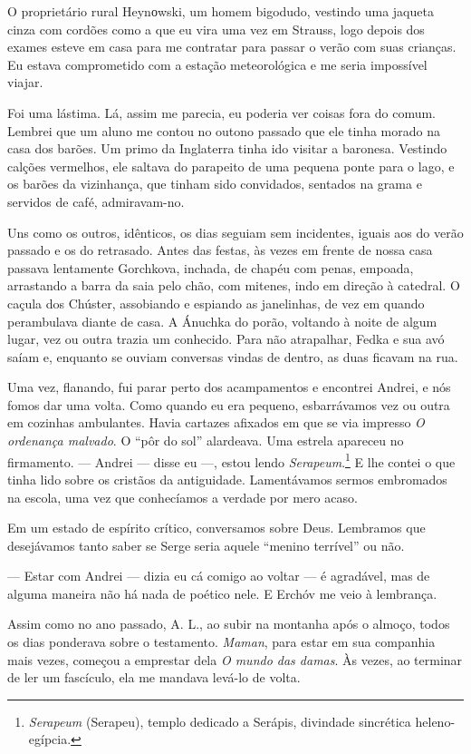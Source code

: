 O proprietário rural Heynоwski, um homem bigodudo, vestindo uma jaqueta
cinza com cordões como a que eu vira uma vez em Strauss, logo depois dos
exames esteve em casa para me contratar para passar o verão com suas
crianças. Eu estava comprometido com a estação meteorológica e me seria
impossível viajar.

Foi uma lástima. Lá, assim me parecia, eu poderia ver coisas fora do
comum. Lembrei que um aluno me contou no outono passado que ele tinha
morado na casa dos barões. Um primo da Inglaterra tinha ido visitar a
baronesa. Vestindo calções vermelhos, ele saltava do parapeito de uma
pequena ponte para o lago, e os barões da vizinhança, que tinham sido
convidados, sentados na grama e servidos de café, admiravam-no.

Uns como os outros, idênticos, os dias seguiam sem incidentes, iguais
aos do verão passado e os do retrasado. Antes das festas, às vezes em
frente de nossa casa passava lentamente Gorchkova, inchada, de chapéu
com penas, empoada, arrastando a barra da saia pelo chão, com mitenes,
indo em direção à catedral. O caçula dos Chúster, assobiando e espiando
as janelinhas, de vez em quando perambulava diante de casa. A Ánuchka do
porão, voltando à noite de algum lugar, vez ou outra trazia um
conhecido. Para não atrapalhar, Fedka e sua avó saíam e, enquanto se
ouviam conversas vindas de dentro, as duas ficavam na rua.

Uma vez, flanando, fui parar perto dos acampamentos e encontrei Andrei,
e nós fomos dar uma volta. Como quando eu era pequeno, esbarrávamos vez
ou outra em cozinhas ambulantes. Havia cartazes afixados em que se via
impresso \emph{O ordenança malvado}. O ``pôr do sol'' alardeava. Uma
estrela apareceu no firmamento. --- Andrei --- disse eu ---, estou lendo
\emph{Serapeum}.\footnote{\emph{Serapeum} (Serapeu), templo dedicado a
  Serápis, divindade sincrética heleno-egípcia.} E lhe contei o que
tinha lido sobre os cristãos da antiguidade. Lamentávamos sermos
embromados na escola, uma vez que conhecíamos a verdade por mero acaso.

Em um estado de espírito crítico, conversamos sobre Deus. Lembramos que
desejávamos tanto saber se Serge seria aquele ``menino terrível'' ou
não.

--- Estar com Andrei --- dizia eu cá comigo ao voltar --- é agradável,
mas de alguma maneira não há nada de poético nele. E Erchóv me veio à
lembrança.

Assim como no ano passado, A. L., ao subir na montanha após o almoço,
todos os dias ponderava sobre o testamento. \emph{Maman}, para estar em
sua companhia mais vezes, começou a emprestar dela \emph{O mundo das
damas}. Às vezes, ao terminar de ler um fascículo, ela me mandava
levá-lo de volta.

